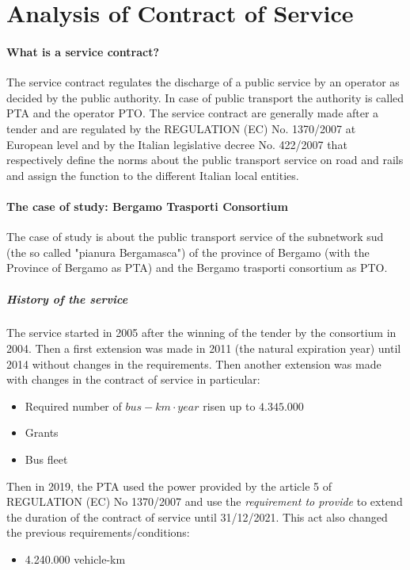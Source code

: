 \section{Analysis of Contract of Service}
\label{sec:contract}
\paragraph{What is a service contract?}
The service contract regulates the discharge of a public service by an operator as decided by the public authority. In case of public transport the authority is called PTA and the operator PTO. The service contract are generally made after a tender and are regulated by the REGULATION (EC) No. 1370/2007 at European level and by the Italian legislative decree No. 422/2007 that respectively define the norms about the public transport service on road and rails and assign the function to the different Italian local entities.

\paragraph{The case of study: Bergamo Trasporti Consortium}
The case of study is about the public transport service of the subnetwork sud (the so called "pianura Bergamasca") of the province of Bergamo (with the Province of Bergamo as PTA) and the Bergamo trasporti consortium as PTO.

\subparagraph{History of the service} The service started in 2005 after the winning of the tender by the consortium in 2004. Then a first extension was made in 2011 (the natural expiration year) until 2014 without changes in the requirements. Then another extension was made with changes in the contract of service in particular:
\begin{itemize}
    \item Required number of $bus-km\cdot year$ risen up to $4.345.000$
    \item Grants
    \item Bus fleet
\end{itemize}

Then in 2019, the PTA used the power provided by the article 5 of REGULATION (EC) No 1370/2007 and use the \emph{requirement to provide} to extend the duration of the contract of service until 31/12/2021. This act also changed the previous requirements/conditions:
\begin{itemize}
    \item 4.240.000 vehicle-km
\end{itemize}

